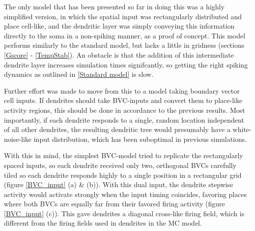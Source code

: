 \documentclass{article}
\begin{document}
    The only model that has been presented so far in doing this was a highly simplified version, in which the spatial input was rectangularly distributed and place cell-like, and the dendritic layer was simply conveying this information directly to the soma in a non-spiking manner, as a proof of concept. This model performs similarly to the standard model, but lacks a little in gridness (sections \ref{Gscore} - \ref{TempStab}). An obstacle is that the addition of this intermediate dendrite layer increases simulation times signifcantly, so getting the right spiking dynamics as outlined in \ref{Standard model} is slow.

    Further effort was made to move from this to a model taking boundary vector cell inputs. If dendrites should take BVC-inputs and convert them to place-like activity regions, this should be done in accordance to the previous results. Most importantly, if each dendrite responds to a single, random location independent of all other dendrites, the resulting dendritic tree would presumably have a white-noise-like input distribution, which has been suboptimal in previous simulations.

    With this in mind, the simplest BVC-model tried to replicate the rectangularly spaced inputs, so each dendrite received only two, orthogonal BVCs carefully tiled so each dendrite responds highly to a single position in a rectangular grid (figure \ref{BVC_input} (a) \& (b)). With this dual input, the dendrite stepwise activity would activate strongly when the input timing coincides, favoring places where both BVCs are equally far from their favored firing activity (figure \ref{BVC_input} (c)). This gave dendrites a diagonal cross-like firing field, which is different from the firing fields used in dendrites in the MC model.
\end{document}
